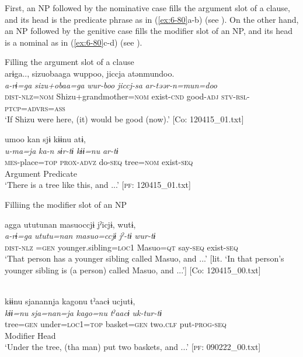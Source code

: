 First, an NP followed by the nominative case fills the argument slot of a clause, and its head is the predicate phrase as in (\ref{ex:6-80}a-b) (see ). On the other hand, an NP followed by the genitive case fills the modifier slot of an NP, and its head is a nominal as in (\ref{ex:6-80}c-d) (see ).

\ea\label{ex:6-80}
 Filling the argument slot of a clause\\

 \ea
 {\TM}
\glll  arɨga..,  sizuobaaga  wuppoo,  jiccja   atənmundoo.\\
\textit{a-rɨ=ga}  \textit{sizu+obaa=ga}  \textit{wur-boo}  \textit{jiccj-sa}  \textit{ar-təər-n=mun=doo}\\
\textsc{dist}-\textsc{nlz}=\textsc{nom}  Shizu+grandmother=\textsc{nom}  exist-\textsc{cnd}  good-\textsc{adj} \textsc{stv}-\textsc{rsl}-\textsc{ptcp}=\textsc{advrs}=\textsc{ass}\\
\glt ‘If Shizu were here, (it) would be good (now).’ [Co: 120415\_01.txt]

\ex
{\TM}
\gllll umoo  kan  sjɨ  kɨɨnu  atɨ,\\
\textit{u-ma=ja}  \textit{ka-n}  \textit{sɨr-tɨ}  \textit{kɨɨ=nu}  \textit{ar-tɨ}\\
\textsc{mes}-place=\textsc{top}  \textsc{prox}-\textsc{advz}  do-\textsc{seq}  tree=\textsc{nom}  exist-\textsc{seq}\\
            Argument  Predicate\\
\glt ‘There is a tree like this, and ...’ [\textsc{pf}: 120415\_01.txt]

  Filliing the modifier slot of an NP

\ex
{\TM}
\glll agga  ututunan  masuoccjɨ  jˀicjɨ,      wutɨ,\\
\textit{a-rɨ=ga}  \textit{ututu=nan}  \textit{masuo=ccjɨ}  \textit{jˀ-tɨ}      \textit{wur-tɨ}\\
\textsc{dist}-\textsc{nlz} =\textsc{gen}  younger.sibling=\textsc{loc1}  Masuo=\textsc{qt}  say-\textsc{seq}   exist-\textsc{seq}\\
\glt ‘That person has a younger sibling called Masuo, and ...’
[lit. ‘In that person’s younger sibling is (a person) called Masuo, and ...’]      [Co: 120415\_00.txt]

\ex\relax[= (\ref{ex:6-62}a)]\\
{\TM}
\gllll  kɨɨnu  sjanannja  kagonu  tˀaacɨ  ucjutɨ,\\
\textit{kɨɨ=nu}  \textit{sja=nan=ja}  \textit{kago=nu}  \textit{tˀaacɨ}  \textit{uk-tur-tɨ}\\
tree=\textsc{gen}  under=\textsc{loc1}=\textsc{top}  basket=\textsc{gen}  two.\textsc{clf}  put-\textsc{prog}-\textsc{seq}\\
      Modifier  Head      \\
\glt ‘Under the tree, (tha man) put two baskets, and ...’ [\textsc{pf}: 090222\_00.txt]
\z
\z


